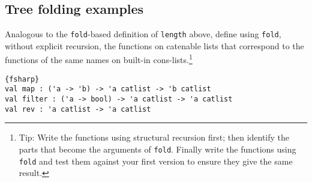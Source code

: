 \subsection*{Tree folding examples}

Analogous to the \verb|fold|-based definition of \verb|length| above, define using \verb|fold|, without explicit recursion, the functions on catenable lists that correspond to the functions of the same names on built-in cons-lists.\footnote{Tip: Write the functions using structural recursion first; then identify the parts that become the arguments of \texttt{fold}. Finally write the functions using \texttt{fold} and test them against your first version to ensure they give the same result.}  

\begin{lstlisting}{fsharp}
val map : ('a -> 'b) -> 'a catlist -> 'b catlist 
val filter : ('a -> bool) -> 'a catlist -> 'a catlist 
val rev : 'a catlist -> 'a catlist
\end{lstlisting}

